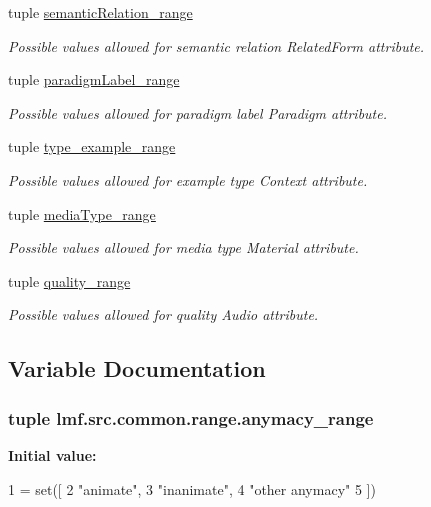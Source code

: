 \begin{DoxyCompactItemize}
tuple \hyperlink{namespacelmf_1_1src_1_1common_1_1range_abab5b7b201360f47699b34e9e685deb6}{semantic\+Relation\+\_\+range}
\begin{DoxyCompactList}\small\item\em Possible values allowed for semantic relation Related\+Form attribute. \end{DoxyCompactList}\item 
tuple \hyperlink{namespacelmf_1_1src_1_1common_1_1range_a9915518fc99ee54c5ac61a23dc12aefe}{paradigm\+Label\+\_\+range}
\begin{DoxyCompactList}\small\item\em Possible values allowed for paradigm label Paradigm attribute. \end{DoxyCompactList}\item 
tuple \hyperlink{namespacelmf_1_1src_1_1common_1_1range_ac02d347b39dab64b3ce3604168d1b652}{type\+\_\+example\+\_\+range}
\begin{DoxyCompactList}\small\item\em Possible values allowed for example type Context attribute. \end{DoxyCompactList}\item 
tuple \hyperlink{namespacelmf_1_1src_1_1common_1_1range_a61963614ed4bb258825e4104a8b47014}{media\+Type\+\_\+range}
\begin{DoxyCompactList}\small\item\em Possible values allowed for media type Material attribute. \end{DoxyCompactList}\item 
tuple \hyperlink{namespacelmf_1_1src_1_1common_1_1range_a6aef6275dfffea6c0ebf4f105ae35b64}{quality\+\_\+range}
\begin{DoxyCompactList}\small\item\em Possible values allowed for quality Audio attribute. \end{DoxyCompactList}\end{DoxyCompactItemize}


\subsection{Variable Documentation}
\hypertarget{namespacelmf_1_1src_1_1common_1_1range_a28fddc4c01c49d3a0a5d2446ad9f6edd}{
\subsubsection[{anymacy\+\_\+range}]{\setlength{\rightskip}{0pt plus 5cm}tuple lmf.\+src.\+common.\+range.\+anymacy\+\_\+range}}\label{namespacelmf_1_1src_1_1common_1_1range_a28fddc4c01c49d3a0a5d2446ad9f6edd}
{\bfseries Initial value\+:}
\begin{DoxyCode}
1 = set([
2     \textcolor{stringliteral}{"animate"},
3     \textcolor{stringliteral}{"inanimate"},
4     \textcolor{stringliteral}{"other anymacy"}
5 ])
\end{DoxyCode}


